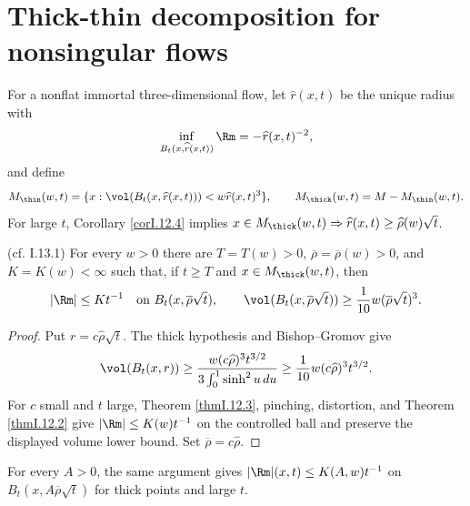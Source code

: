 \section{Thick-thin decomposition for nonsingular flows} \label{I.13.1}
For a nonflat immortal three-dimensional flow, let $\widehat r(x,t)$ be the
unique radius with
\[
\inf_{B_t(x,\widehat r(x,t))}\Rm=-\widehat r(x,t)^{-2},
\]
and define
\begin{equation}\label{thinpart}
M_{\thin}(w,t)=\{x:\vol(B_t(x,\widehat r(x,t)))<
w\widehat r(x,t)^3\},\qquad M_{\thick}(w,t)=M-M_{\thin}(w,t).
\end{equation}
For large $t$, Corollary \ref{corI.12.4} implies
$x\in M_{\thick}(w,t)\Rightarrow\widehat r(x,t)\geq\widehat\rho(w)\sqrt t$.
\begin{theorem}
\label{thm:kl-thick-thin-decomposition-nonsingular-flows-existence-thick-thin-geometry}

(cf. I.13.1) \label{thmI.13.1}
For every $w>0$ there are $T=T(w)>0$, $\overline\rho=\overline\rho(w)>0$,
and $K=K(w)<\infty$ such that, if $t\geq T$ and
$x\in M_{\thick}(w,t)$, then
\[
|\Rm|\leq Kt^{-1}\quad\hbox{on }B_t(x,\overline\rho\sqrt t),
\qquad
\vol(B_t(x,\overline\rho\sqrt t))
\geq\frac1{10}w(\overline\rho\sqrt t)^3.
\]
\end{theorem}
\begin{proof}
\sketch Put $r=c\widehat\rho\sqrt t$.  The thick hypothesis and
Bishop--Gromov give
\[
\vol(B_t(x,r))\geq
\frac{w(c\widehat\rho)^3t^{3/2}}{3\int_0^1\sinh^2u\,du}
\geq\frac1{10}w(c\widehat\rho)^3t^{3/2}.
\]
For $c$ small and $t$ large, Theorem \ref{thmI.12.3}, pinching, distortion,
and Theorem \ref{thmI.12.2} give $|\Rm|\leq K(w)t^{-1}$ on the controlled
ball and preserve the displayed volume lower bound.  Set
$\overline\rho=c\widehat\rho$.
\end{proof}
\begin{remark}
\label{rem:kl-thick-thin-decomposition-nonsingular-flows-estimates-thick-thin-geometry}


For every $A>0$, the same argument gives
$|\Rm|(x,t)\leq K(A,w)t^{-1}$ on
$B_t(x,A\overline\rho\sqrt t)$ for thick points and large $t$.
\end{remark}
